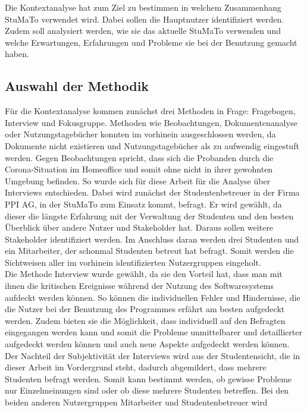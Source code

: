 \documentclass[
  12pt,
  ngerman,
  a4paper,
]{article}
\begin{document}
Die Kontextanalyse hat zum Ziel zu bestimmen in welchem Zusammenhang
StuMaTo verwendet wird. Dabei sollen die Hauptnutzer identifiziert
werden. Zudem soll analysiert werden, wie sie das aktuelle StuMaTo
verwenden und welche Erwartungen, Erfahrungen und Probleme sie bei der
Benutzung gemacht haben.

\hypertarget{auswahl-der-methodik}{%
\subsection{Auswahl der Methodik}\label{auswahl-der-methodik}}

Für die Kontextanalyse kommen zunächst drei Methoden in Frage:
Fragebogen, Interview und Fokusgruppe. Methoden wie Beobachtungen,
Dokumentenanalyse oder Nutzungstagebücher konnten im vorhinein
ausgeschlossen werden, da Dokumente nicht existieren und
Nutzungstagebücher als zu aufwendig eingestuft werden. Gegen
Beobachtungen spricht, dass sich die Probanden durch die
Corona-Situation im Homeoffice und somit ohne nicht in ihrer gewohnten
Umgebung befinden. So wurde sich für diese Arbeit für die Analyse über
Interviews entschieden. Dabei wird zunächst der Studentenbetreuer in der
Firma PPI AG, in der StuMaTo zum Einsatz kommt, befragt. Er wird
gewählt, da dieser die längste Erfahrung mit der Verwaltung der
Studenten und den besten Überblick über andere Nutzer und Stakeholder
hat. Daraus sollen weitere Stakeholder identifiziert werden. Im
Anschluss daran werden drei Studenten und ein Mitarbeiter, der schonmal
Studenten betreut hat befragt. Somit werden die Sichtweisen aller im
vorhinein identifizierten Nutzergruppen eingeholt.\\
Die Methode Interview wurde gewählt, da sie den Vorteil hat, dass man
mit ihnen die kritischen Ereignisse während der Nutzung des
Softwaresystems aufdeckt werden können. So können die individuellen
Fehler und Hindernisse, die die Nutzer bei der Benutzung des Programmes
erfährt am besten aufgedeckt werden. Zudem bieten sie die Möglichkeit,
dass individuell auf den Befragten eingegangen werden kann und somit die
Probleme unmittelbarer und detaillierter aufgedeckt werden können und
auch neue Aspekte aufgedeckt werden können. Der Nachteil der
Subjektivität der Interviews wird aus der Studentensicht, die in dieser
Arbeit im Vordergrund steht, dadurch abgemildert, dass mehrere Studenten
befragt werden. Somit kann bestimmt werden, ob gewisse Probleme nur
Einzelmeinungen sind oder ob diese mehrere Studenten betreffen. Bei den
beiden anderen Nutzergruppen Mitarbeiter und Studentenbetreuer wird
\end{document}
